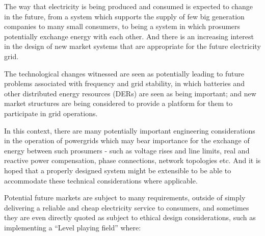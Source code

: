 






The way that electricity is being produced and consumed is expected to change in the future, from a system which supports the supply of few big generation companies to many small consumers, to being a system in which prosumers potentially exchange energy with each other.
And there is an increasing interest in the design of new market systems that are appropriate for the future electricity grid.

The technological changes witnessed are seen as potentially leading to future problems associated with frequency and grid stability, in which batteries and other distributed energy resources (DERs) are seen as being important; and new market structures are being considered to provide a platform for them to participate in grid operations.

In this context, there are many potentially important engineering considerations in the operation of powergrids which may bear importance for the exchange of energy between such prosumers - such as voltage rises and line limits, real and reactive power compensation, phase connections, network topologies etc.
And it is hoped that a properly designed system might be extensible to be able to accommodate these technical considerations where applicable.

Potential future markets are subject to many requirements, outside of simply delivering a reliable and cheap electricity service to consumers, and sometimes they are even directly quoted as subject to ethical design considerations, such as implementing a ``Level playing field'' where:

